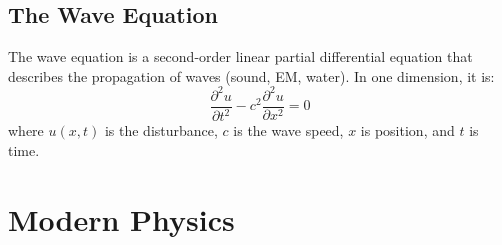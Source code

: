 \documentclass[11pt]{report}
\begin{document}
\section{The Wave Equation}

\begin{definition}
    The wave equation is a second-order linear partial differential equation that describes the propagation of waves (sound, EM, water). In one dimension, it is:
    \begin{equation}
        \frac{\partial^2 u}{\partial t^2} - c^2 \frac{\partial^2 u}{\partial x^2} = 0
    \end{equation}
    where $u(x,t)$ is the disturbance, $c$ is the wave speed, $x$ is position, and $t$ is time.
\end{definition}


\chapter{Modern Physics}
\end{document}
